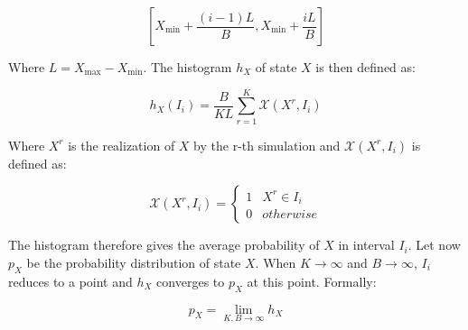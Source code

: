   $$\left[X_{\min}+\frac{(i-1)L}{B}, X_{\min}+\frac{iL}{B}\right]$$

  Where $L=X_{\max}-X_{\min}$.
  The histogram $h_X$ of state $X$ is then defined as:

  $$h_X(I_i) = \frac{B}{KL}\sum\limits_{r=1}^K\mathcal{X}(X^r,I_i)$$

  Where $X^r$ is the realization of $X$ by the r-th simulation and $\mathcal{X}(X^r, I_i)$ is defined as:

  $$\mathcal{X}(X^r, I_i) = \begin{cases}1 &X^r\in I_i\\0 & otherwise\end{cases}$$

  The histogram therefore gives the average probability of $X$ in interval $I_i$.
  Let now $p_X$ be the probability distribution of state $X$.
  When $K\rightarrow\infty$ and $B\rightarrow\infty$, $I_i$ reduces to a point and $h_X$ converges to $p_X$ at this point.
  Formally:

  $$p_X = \lim\limits_{K,B\rightarrow\infty}h_X$$

